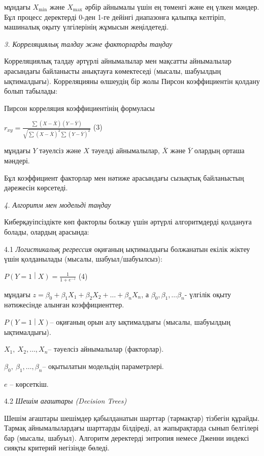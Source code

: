 \documentclass[
]{article}
\begin{document}
мұндағы \(X_{\min}\) және \(X_{\max}\) әрбір айнымалы үшін ең төменгі
және ең үлкен мәндер. Бұл процесс деректерді 0-ден 1-ге дейінгі
диапазонға қалыпқа келтіріп, машиналық оқыту үлгілерінің жұмысын
жеңілдетеді.

\emph{3. Корреляциялық талдау және факторларды таңдау}

Корреляциялық талдау әртүрлі айнымалылар мен мақсатты айнымалылар
арасындағы байланысты анықтауға көмектеседі (мысалы, шабуылдың
ықтималдығы). Корреляцияны өлшеудің бір жолы Пирсон коэффициентін
қолдану болып табылады:

Пирсон корреляция коэффициентінің формуласы

\(r_{xy} = \frac{\sum_{}^{}{(X - \overline{X})(Y - \overline{Y})}}{\sqrt{\sum_{}^{}{{(X - \overline{X})}^{2}\sum_{}^{}{(Y - \overline{Y})}^{2}}}}\)
(3)

мұндағы \(Y\) тәуелсіз және \(X\) тәуелді айнымалылар, \(\overline{X}\)
және \(\overline{Y}\) олардың орташа мәндері.

Бұл коэффициент факторлар мен нәтиже арасындағы сызықтық байланыстың
дәрежесін көрсетеді.

\emph{4. Алгоритм мен модельді таңдау}

Киберқауіпсіздікте көп факторлы болжау үшін әртүрлі алгоритмдерді
қолдануға болады, олардың арасында:

4.1 \emph{Логистикалық регрессия} оқиғаның ықтималдығы болжанатын екілік
жіктеу үшін қолданылады (мысалы, шабуыл/шабуылсыз):

\(P\left( Y = 1 \middle| X \right) = \frac{1}{1 + e^{- z}}\) (4)

мұндағы
\(z = \beta_{0} + \beta_{1}X_{1} + \beta_{2}X_{2} + \ldots + \beta_{n}X_{n}\),
а \(\beta_{0},\beta_{1},\ldots\beta_{n}\)- үлгілік оқыту нәтижесінде
алынған коэффициенттер.

\(P\left( Y = 1 \middle| X \right)\)-- оқиғаның орын алу ықтималдығы
(мысалы, шабуылдың ықтималдығы).

\(X_{1},\ X_{2},\ldots,X_{n}\)-- тәуелсіз айнымалылар (факторлар).

\(\beta_{0},\ \beta_{1},\ldots,\beta_{n}\)-- оқытылатын модельдің
параметрлері.

\(e\) -- көрсеткіш.

4.2 \emph{Шешім ағаштары (Decision Trees)}

Шешім ағаштары шешімдер қабылданатын шарттар (тармақтар) тізбегін
құрайды. Тармақ айнымалылардағы шарттарды білдіреді, ал жапырақтарда
сынып белгілері бар (мысалы, шабуыл). Алгоритм деректерді энтропия
немесе Дженни индексі сияқты критерий негізінде бөледі.
\end{document}
